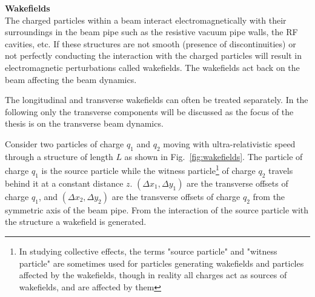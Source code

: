 \textbf{Wakefields}\\
The charged particles within a beam interact electromagnetically with their surroundings in the beam pipe such as the resistive vacuum pipe walls, the RF cavities, etc. If these structures are not smooth (presence of discontinuities) or not perfectly conducting the interaction with the charged particles will result in electromagnetic perturbations called wakefields. The wakefields act back on the beam affecting the beam dynamics.


The longitudinal and transverse wakefields can often be treated separately. In the following only the transverse components will be discussed as the focus of the thesis is on the transverse beam dynamics.

 
Consider two particles of charge $q_1$ and $q_2$ moving with ultra-relativistic speed through a structure of length $L$ as shown in Fig.~\ref{fig:wakefields}. The particle of charge $q_1$ is the source particle while the witness particle\footnote{In studying collective effects, the terms "source particle" and "witness particle" are sometimes used for particles generating wakefields and particles affected by the wakefields, though in reality all charges act as sources of wakefields, and are affected by them}  of charge $q_2$ travels behind it at a constant distance $z$. $(\Delta x_1, \Delta y_1)$ are the transverse offsets of charge $q_1$, and $(\Delta x_2, \Delta y_2)$ are the transverse offsets of charge $q_2$ from the symmetric axis of the beam pipe. From the interaction of the source particle with the structure a wakefield is generated. 

